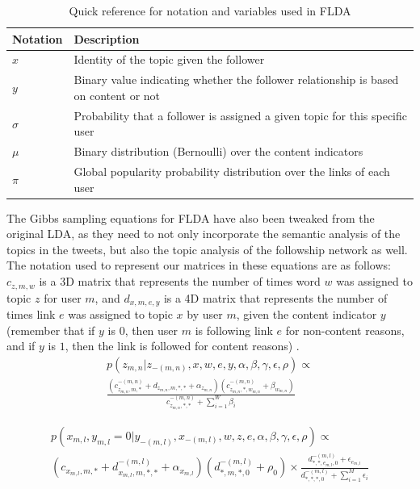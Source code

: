 \documentclass[a4paper]{article}
\begin{document}
\begin{table}[h]
  \centering %
  \begin{tabular}{ |l|l| }
    \hline
    Notation & Description \\
    \hline
    \hline
    $x$ & Identity of the topic given the follower \\
    $y$ & Binary value indicating whether the follower relationship is based on content or not \\
    $\sigma$ & Probability that a follower is assigned a given topic for this specific user \\
    $\mu$ & Binary distribution (Bernoulli) over the content indicators \\
    $\pi$ & Global popularity probability distribution over the links of each user \\
    \hline
  \end{tabular}
  \caption{Quick reference for notation and variables used in FLDA}
  \label{tab:fldavars}
\end{table}

The Gibbs sampling equations for FLDA have also been tweaked from the original LDA, as they need to not only incorporate the semantic analysis of the topics in the tweets, but also the topic analysis of the followship network as well. The notation used to represent our matrices in these equations are as follows: $c_{z, m, w}$ is a 3D matrix that represents the number of times word $w$ was assigned to topic $z$ for user $m$, and $d_{x, m, e, y}$ is a 4D matrix that represents the number of times link $e$ was assigned to topic $x$ by user $m$, given the content indicator $y$ (remember that if $y$ is $0$, then user $m$ is following link $e$ for non-content reasons, and if $y$ is $1$, then the link is followed for content reasons) \cite{flda}.
\begin{equation}\label{eq:flda_sem}
  \begin{gathered}
    p(z_{m, n} | z_{-(m, n)}, x, w, e, y, \alpha, \beta, \gamma, \epsilon, \rho) \propto \\
      \frac{(c_{z_{m, n}, m, *}^{-(m, n)} + d_{z_{m, n}, m, *, *} + \alpha_{z_{m, n}})
      (c_{z_{m, n}, *, w_{m, n}}^{-(m, n)} + \beta_{w_{m, n}})}
      {c_{z_{m, n}, *, *}^{-(m, n)} + \sum^W_{i = 1}\beta_i}
  \end{gathered}
\end{equation}

\begin{equation}\label{eq:flda_net_0}
  \begin{gathered}
    p(x_{m, l}, y_{m, l} = 0 | y_{-(m, l)}, x_{-(m, l)}, w, z, e, \alpha, \beta, \gamma, \epsilon, \rho) \propto \\
      (c_{x_{m, l}, m, *} + d_{x_{m, l}, m, *, *}^{-(m, l)} + \alpha_{x_{m, l}})(d_{*, m, *, 0}^{-(m, l)} + \rho_0) \times
      \frac{d_{*, *, e_{m, l}, 0}^{-(m, l)} + \epsilon_{e_{m, l}}}
      {d_{*, *, *, 0}^{-(m, l)} + \sum^M_{i = 1}\epsilon_i}
  \end{gathered}
\end{equation}
\end{document}
